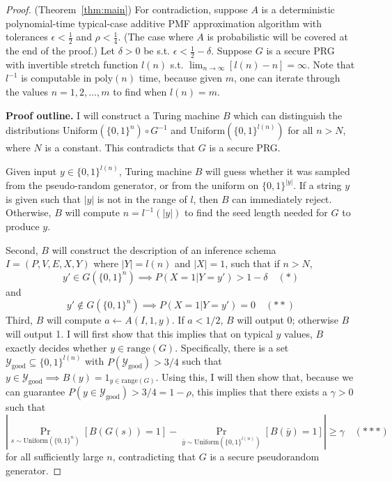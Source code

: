 \documentclass{article}
\def \Ygood{\mathcal{Y}_\text{good}}
\def \by{{\bar{y}}}
\theoremstyle{definition}
\theoremstyle{remark}
\begin{document}
\begin{proof}{(Theorem~\ref{thm:main})}
For contradiction, suppose $A$ is a deterministic polynomial-time typical-case additive PMF approximation algorithm with tolerances $\epsilon < \frac{1}{2}$ and $\rho < \frac{1}{4}$.
(The case where $A$ is probabilistic will be covered at the end of the proof.)
Let $\delta > 0$ be s.t. $\epsilon < \frac{1}{2} - \delta$.
Suppose $G$ is a secure PRG with invertible stretch function $l(n)$ s.t. $\lim_{n \to \infty} [l(n) - n] = \infty$.
Note that $l^{-1}$ is computable in $\text{poly}(n)$ time, because given $m$, one can iterate through the values $n = 1, 2, \dots, m$ to find when $l(n) = m$.

\medskip
\noindent \textbf{Proof outline.}
I will construct a Turing machine $B$ which can distinguish the distributions $\text{Uniform}(\{0, 1\}^n) \circ G^{-1}$ and $\text{Uniform}(\{0, 1\}^{l(n)})$ for all $n > N$, where $N$ is a constant.  This contradicts that $G$ is a secure PRG.

Given input $y \in \{0, 1\}^{l(n)}$,
Turing machine $B$ will guess whether it was sampled from the pseudo-random generator, or from the uniform on $\{0, 1\}^{|y|}$.
If a string $y$ is given such that $|y|$ is not in the range of $l$, then $B$ can immediately reject.
Otherwise, $B$ will compute $n = l^{-1}(|y|)$ to find the seed length needed for $G$ to produce $y$.

Second, $B$ will construct the description of an inference schema $I = (P, V, E, X, Y)$ where $|Y| = l(n)$ and $|X| = 1$, such that if $n > N$,
$$
y' \in G(\{0, 1\}^n) \implies P(X = 1 | Y = y') > 1 - \delta \quad (*)
$$
and
$$
y' \notin G(\{0, 1\}^n) \implies P(X = 1 | Y = y') = 0 \quad (**)
$$
Third, $B$ will compute $a \gets A(I, 1, y)$.
If $a < 1/2$, $B$ will output 0; otherwise $B$ will output 1.
I will first show that this implies that on typical $y$ values,
$B$ exactly decides whether $y \in \text{range}(G)$.
Specifically, there is a set $\Ygood \subseteq \{0, 1\}^{l(n)}$ with $P(\Ygood) > 3/4$ such that
$y \in \Ygood \implies B(y) = 1_{y \in \text{range}(G)}$.
Using this,
I will then show that, because we can guarantee $P(y \in \Ygood) > 3/4 = 1 - \rho$,
this implies that there exists a $\gamma > 0$ such that
$$
|\Pr_{s \sim \text{Uniform}(\{0, 1\}^n)}[B(G(s)) = 1] - \Pr_{\by \sim \text{Uniform}(\{0, 1\}^{l(n)})}[B(\by) = 1]| \geq \gamma \quad (***)
$$
for all sufficiently large $n$, contradicting that $G$ is a secure pseudorandom generator.


\end{proof}
\end{document}

